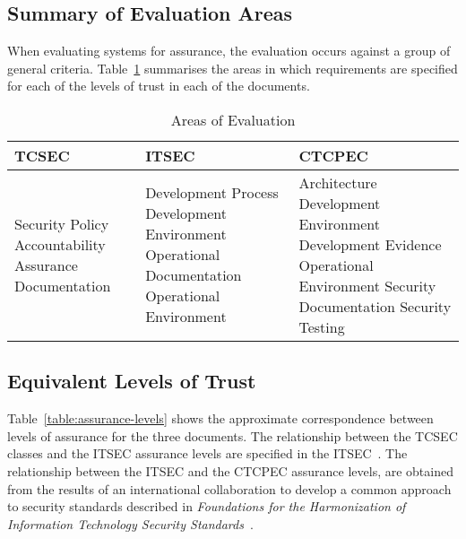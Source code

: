    
\subsection{Summary of Evaluation Areas}
    When evaluating systems for assurance, the evaluation occurs against a group of general criteria. 
    Table~\ref{table:areas} summarises the areas in which requirements are specified
    for each of the levels of trust in each of the documents.

    \begin{table}[H]
    \begin{center}
        \begin{tabular}{|>{\sffamily}p{4.5cm}|>{\sffamily}p{4.5cm}|>{\sffamily}p{4.5cm}|} \hline
            \bfseries{TCSEC}   &   \bfseries{ITSEC}   &   \bfseries{CTCPEC}  \\ \hline \hline
            Security Policy \newline
            Accountability  \newline
            Assurance       \newline
            Documentation
            &
            Development Process         \newline
            Development Environment     \newline
            Operational Documentation   \newline
            Operational Environment     \newline
            &
            Architecture                \newline
            Development Environment     \newline
            Development Evidence        \newline
            Operational Environment     \newline
            Security Documentation      \newline
            Security Testing            
            \\ \hline
        \end{tabular} 
    \end{center}
    \caption{Areas of Evaluation} \label{table:areas}
    \end{table}

\subsection{Equivalent Levels of Trust}
    Table~\ref{table:assurance-levels} shows the approximate correspondence between
    levels of assurance for the three documents. The relationship between the TCSEC
    classes and the ITSEC assurance levels are specified in the ITSEC~\cite{itsec}. The relationship
    between the ITSEC and the CTCPEC assurance levels, are obtained from the results of an international
    collaboration to develop a common approach to security standards described in
    \emph{Foundations for the Harmonization of Information Technology Security Standards}~\cite{harmony}.

